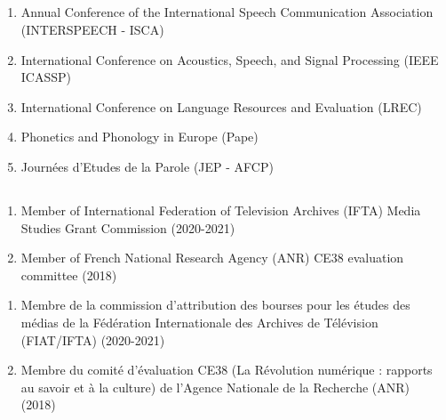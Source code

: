 \subsection{\EvalConf}
\begin{enumerate}[nosep,after=\strut, leftmargin=1em, itemsep=3pt]
\item Annual Conference of the International Speech Communication Association (INTERSPEECH - ISCA)
\item International Conference on Acoustics, Speech, and Signal Processing (IEEE ICASSP)
\item International Conference on Language Resources and Evaluation (LREC)
\item Phonetics and Phonology in Europe (Pape)
\item Journées d’Etudes de la Parole (JEP - AFCP)
\end{enumerate}
\subsection{\EvalProj}

\begin{en}
\begin{enumerate}[nosep,after=\strut, leftmargin=1em, itemsep=3pt]
\item Member of International Federation of Television Archives (IFTA) Media Studies Grant Commission (2020-2021)
\item Member of French National Research Agency (ANR) CE38 evaluation committee (2018)
\end{enumerate}
\end{en}

\begin{fr}
\begin{enumerate}[nosep,after=\strut, leftmargin=1em, itemsep=3pt]
\item Membre de la commission d'attribution des bourses pour les études des médias de la Fédération Internationale des Archives de Télévision (FIAT/IFTA) (2020-2021)
\item Membre du comité d'évaluation CE38 (La Révolution numérique : rapports au savoir et à la culture) de l'Agence Nationale de la Recherche (ANR) (2018)
\end{enumerate}
\end{fr}

